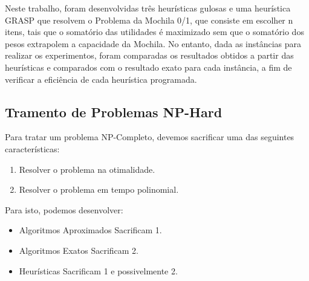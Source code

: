 \documentclass[a4paper, 12pt]{article}
\begin{document}
Neste trabalho, foram desenvolvidas três heurísticas gulosas e uma heurística GRASP que resolvem 
o Problema da Mochila 0/1, que consiste em escolher n itens, tais que o somatório das utilidades é maximizado sem 
que o somatório dos pesos extrapolem a capacidade da Mochila. No entanto, dada as instâncias para realizar
os experimentos, foram comparadas os resultados obtidos a partir das heurísticas e comparados com o resultado
exato para cada instância, a fim de verificar a eficiência de cada heurística programada.




\subsection{Tramento de Problemas NP-Hard}

Para tratar um problema NP-Completo, devemos sacrificar uma das seguintes características:
\begin{enumerate}
    \item Resolver o problema na otimalidade.
    \item Resolver o problema em tempo polinomial.
\end{enumerate}
Para isto, podemos desenvolver:
\begin{itemize}
    \item Algoritmos Aproximados Sacrificam 1.
    \item Algoritmos Exatos Sacrificam 2.
    \item Heurísticas Sacrificam 1 e possivelmente 2.
\end{itemize}
\end{document}
